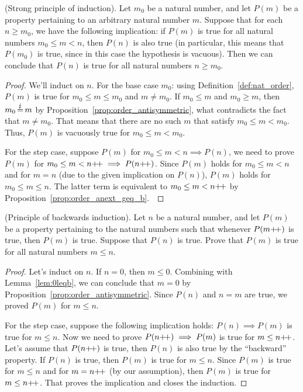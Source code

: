 \begin{proposition}
    \textup{(Strong principle of induction)}. Let $m_0$ be a natural number, and let $P(m)$ be a property pertaining to an arbitrary natural number $m$. Suppose that for each $n \geq m_0$, we have the following implication: if $P(m)$ is true for all natural numbers $m_0 \leq m < n$, then $P(n)$ is also true (in particular, this means that $P (m_0)$ is true, since in this case the hypothesis is vacuous). Then we can conclude that $P(n)$ is true for all natural numbers $n \geq m_0$.
\end{proposition}
\begin{proof}
    We'll induct on $n$. For the base case $m_0$: using Definition~\ref{def:nat_order}, $P(m)$ is true for $m_0 \leq m \leq m_0$ and $m\neq m_0$. If $m_0 \leq m$ and $m_0 \geq m$, then $m_0\operatorname{\stackrel{\lightning}{=}} m$ by Proposition~\ref{prop:order_antisymmetric}, what contradicts the fact that $m \neq m_0$. That means that there are no such $m$ that satisfy $m_0 \leq m < m_0$. Thus, $P(m)$ is vacuously true for $m_0 \leq m < m_0$.

    For the step case, suppose $P(m)$ for $m_0 \leq m < n \implies P(n)$, we need to prove $P(m)$ for $m_0 \leq m < n\operatorname{\!+\!+} \implies P(n\operatorname{\!+\!+})$. Since $P(m)$ holds for $m_0 \leq m < n$ and for $m=n$ (due to the given implication on $P(n)$), $P(m)$ holds for $m_0\leq m \leq n$. The latter term is equivalent to $m_0 \leq m < n\next$ by Proposition~\ref{prop:order_anext_geq_b}.~\color{red}{That means $P(m)$ is true for $m_0 \leq m < n\next$, and it means $P(n\next)$ is true. That closes the induction.}
\end{proof}

\begin{proposition}
    \color{red}
    \textup{(Principle of backwards induction)}. Let $n$ be a natural number, and let $P(m)$ be a property pertaining to the natural numbers such that whenever $P(m\operatorname{\!+\!+})$ is true, then $P(m)$ is true. Suppose that $P(n)$ is true. Prove that $P(m)$ is true for all natural numbers $m \leq n$. 
\end{proposition}
\begin{proof}
    Let's induct on $n$. If $n=0$, then $m\leq 0$. Combining with Lemma~\ref{lem:0leqb}, we can conclude that $m=0$ by Proposition~\ref{prop:order_antisymmetric}. Since $P(n)$ and $n=m$ are true, we proved $P(m)$ for $m \leq n$.

    For the step case, suppose the following implication holds: $P(n) \implies P(m)$ is true for $m \leq n$. Now we need to prove $P(n\operatorname{\!+\!+}) \implies P(m)$ is true for $m\leq n\operatorname{\!+\!+}$. Let's assume that $P(n\next)$ is true, then $P(n)$ is also true by the ``backward'' property. If $P(n)$ is true, then $P(m)$ is true for $m\leq n$. Since $P(m)$ is true for $m \leq n$ and for $m=n\operatorname{\!+\!+}$ (by our assumption), then $P(m)$ is true for $m \leq n\operatorname{\!+\!+}$. That proves the implication and closes the induction.
\end{proof}

